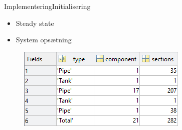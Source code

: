 


\begin{frame}{Implementering}{Initialisering}
     \vfill\vfill\centering  
     \begin{itemize}
     	\item Steady state
     	\item System opsætning
     \end{itemize}
\begin{figure}[H]
\centering
\includegraphics[width=0.4 \textwidth]{figures/sys_setup_matlab.png}
\label{fig:sys_setup_matlab}
\end{figure}
 \vfill\vfill
\end{frame}

%  

